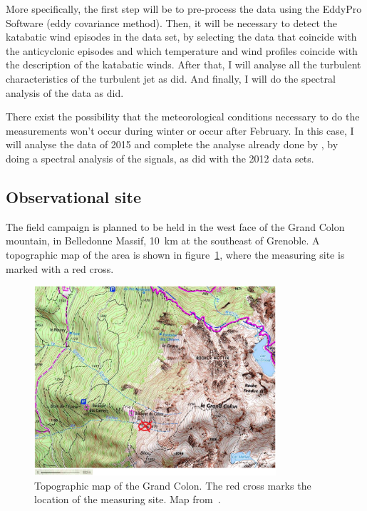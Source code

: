 \documentclass[a4paper,12pt]{article}
\begin{document}
More specifically, the first step will be to pre-process the data using the EddyPro Software (eddy covariance method). Then, it will be necessary to detect the katabatic wind episodes in the data set, by selecting the data that coincide with the anticyclonic episodes and which temperature and wind profiles coincide with the description of the katabatic winds. After that, I will analyse all the turbulent characteristics of the turbulent jet as \citeauthor{jakob} did. And finally, I will do the spectral analysis of the data as \citeauthor{claudine} did. 

There exist the possibility that the meteorological conditions necessary to do the measurements won't occur during winter or occur after February. In this case, I will analyse the data of 2015 and complete the analyse already done by \citeauthor{jakob}, by doing a spectral analysis of the signals, as \citeauthor{claudine} did with the 2012 data sets.

\subsection{Observational site}

The field campaign is planned to be held in the west face of the Grand Colon mountain, in Belledonne Massif, 10~km at the southeast of Grenoble. A topographic map of the area is shown in figure~\ref{fig:obs_site}, where the measuring site is marked with a red cross.

\begin{figure}[!ht]
  \begin{center}
  \includegraphics[width=0.8\textwidth]{fig/grand_colon_jakob.png}
  \caption{Topographic map of the Grand Colon. The red cross marks the location of the measuring site. Map from~\cite{jakob}.}
  \label{fig:obs_site}
  \end{center}
\end{figure}
\end{document}
